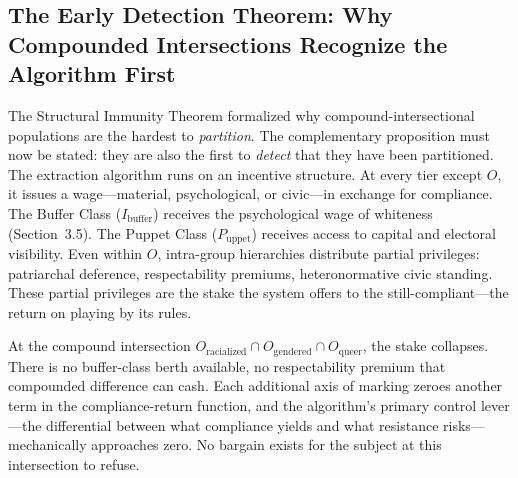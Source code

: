 \subsection{The Early Detection Theorem: Why Compounded Intersections Recognize the Algorithm First}

The Structural Immunity Theorem formalized why compound-intersectional populations are the hardest to \textit{partition}. The complementary proposition must now be stated: they are also the first to \textit{detect} that they have been partitioned. The extraction algorithm runs on an incentive structure. At every tier except $O$, it issues a wage---material, psychological, or civic---in exchange for compliance. The Buffer Class ($I_{\text{buffer}}$) receives the psychological wage of whiteness (Section~3.5). The Puppet Class ($P_{\text{uppet}}$) receives access to capital and electoral visibility. Even within $O$, intra-group hierarchies distribute partial privileges: patriarchal deference, respectability premiums, heteronormative civic standing. These partial privileges are the stake the system offers to the still-compliant---the return on playing by its rules.

At the compound intersection $O_{\text{racialized}} \cap O_{\text{gendered}} \cap O_{\text{queer}}$, the stake collapses. There is no buffer-class berth available, no respectability premium that compounded difference can cash. Each additional axis of marking zeroes another term in the compliance-return function, and the algorithm's primary control lever---the differential between what compliance yields and what resistance risks---mechanically approaches zero. No bargain exists for the subject at this intersection to refuse.

